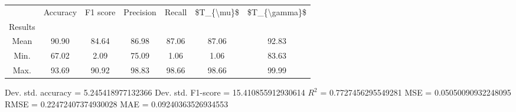 \begin{tabular}{|c|c|c|c|c|c|c|}
\toprule
{} &  Accuracy &  F1 score &  Precision &  Recall &  \$T\_\{\textbackslash mu\}\$ &  \$T\_\{\textbackslash gamma\}\$ \\
Results &           &           &            &         &            &               \\
\hline
Mean    &     90.90 &     84.64 &      86.98 &   87.06 &      87.06 &         92.83 \\
Min.    &     67.02 &      2.09 &      75.09 &    1.06 &       1.06 &         83.63 \\
Max.    &     93.69 &     90.92 &      98.83 &   98.66 &      98.66 &         99.99 \\
\bottomrule
\end{tabular}

 Dev. std. accuracy = 5.245418977132366
 Dev. std. F1-score = 15.410855912930614
 $R^2$ = 0.7727456295549281
 MSE = 0.05050090932248095
 RMSE = 0.22472407374930028
 MAE = 0.09240363526934553
